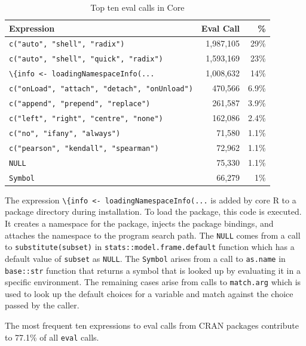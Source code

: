 \documentclass[a4paper,USenglish,cleveref, autoref, thm-restate]{lipics-v2019}
\newcommand{\eval}{\texttt{eval}\xspace}
\renewcommand{\c}[1]{\lstinline{#1}\xspace}
\begin{document}
\begin{table}[!h] \centering
\begin{tabular}{@{}l|rr@{}} \hline
Expression & Eval Call &  \% \\\hline
\c{c("auto", "shell", "radix")} & 1,987,105 & 29\%\\
\c{c("auto", "shell", "quick", "radix")} & 1,593,169  & 23\%\\
\c{\{info <- loadingNamespaceInfo(...} & 1,008,632 &       14\%\\
\c{c("onLoad", "attach", "detach", "onUnload")}   & 470,566 &      6.9\%\\
\c{c("append", "prepend", "replace")} &              261,587&       3.9\% \\
\c{c("left", "right", "centre", "none")} & 162,086     & 2.4\%\\
\c{c("no", "ifany", "always")}   &                71,580 &       1.1\%\\
\c{c("pearson", "kendall", "spearman")}  & 72,962 &      1.1\%\\
\c{NULL}& 75,330  &      1.1\% \\
\c{Symbol}&                 66,279&       1\%\\\hline
\end{tabular}
\caption{Top ten eval calls in Core}\label{B}
\end{table}

The expression \c{\{info <- loadingNamespaceInfo(...} is added by core R
to a package directory during installation. To load the package, this code is
executed. It creates a namespace for the package, injects the package bindings,
and attaches the namespace to the program search path. The \c{NULL} comes from a
call to \c{substitute(subset)} in \c{stats::model.frame.default} function which
has a default value of \c{subset} as \c{NULL}. The \c{Symbol} arises from a
call to \c{as.name} in \c{base::str} function that returns a symbol that is
looked up by evaluating it in a specific environment. The remaining cases arise
from calls to \c{match.arg} which is used to look up the default choices for a
variable and match against the choice passed by the caller.

The most frequent ten expressions to eval calls from CRAN packages
contribute to 77.1\% of all \eval calls.
\end{document}
